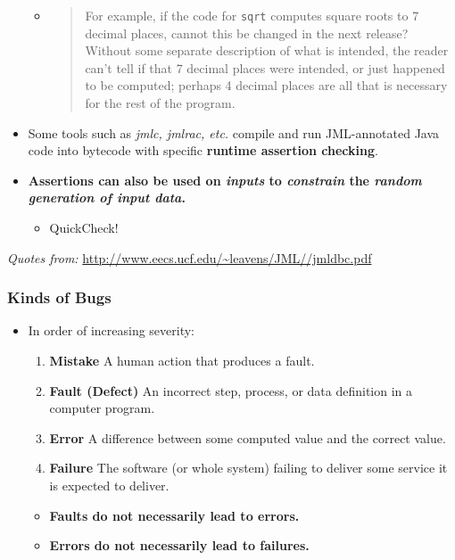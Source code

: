 \documentclass[a4paper]{article}
\providecommand{\tightlist}{%
  \setlength{\itemsep}{0pt}\setlength{\parskip}{0pt}}
\begin{document}
\begin{itemize}
  \begin{itemize}
  \item
    \begin{quote}
    For example, if the code for \texttt{sqrt} computes square roots to
    7 decimal places, cannot this be changed in the next release?
    Without some separate description of what is intended, the reader
    can't tell if that 7 decimal places were intended, or just happened
    to be computed; perhaps 4 decimal places are all that is necessary
    for the rest of the program.
    \end{quote}
  \end{itemize}
\item
  Some tools such as \emph{jmlc, jmlrac, etc.} compile and run
  JML-annotated Java code into bytecode with specific \textbf{runtime
  assertion checking}.
\item
  \textbf{Assertions can also be used on \emph{inputs} to
  \emph{constrain} the \emph{random generation of input data}.}

  \begin{itemize}
  \tightlist
  \item
    QuickCheck!
  \end{itemize}
\end{itemize}

\emph{Quotes from:}
\href{http://www.eecs.ucf.edu/~leavens/JML//jmldbc.pdf}{http://www.eecs.ucf.edu/\textasciitilde{}leavens/JML//jmldbc.pdf}

\hypertarget{kinds-of-bugs}{%
\subsubsection{Kinds of Bugs}\label{kinds-of-bugs}}

\begin{itemize}
\item
  In order of increasing severity:

  \begin{enumerate}
  \def\labelenumi{\arabic{enumi}.}
  \tightlist
  \item
    \textbf{Mistake} A human action that produces a fault.
  \item
    \textbf{Fault (Defect)} An incorrect step, process, or data
    definition in a computer program.
  \item
    \textbf{Error} A difference between some computed value and the
    correct value.
  \item
    \textbf{Failure} The software (or whole system) failing to deliver
    some service it is expected to deliver.
  \end{enumerate}

  \begin{itemize}
  \tightlist
  \item
    \textbf{Faults do not necessarily lead to errors.}
  \item
    \textbf{Errors do not necessarily lead to failures.}
  \end{itemize}
\end{itemize}
\end{document}
